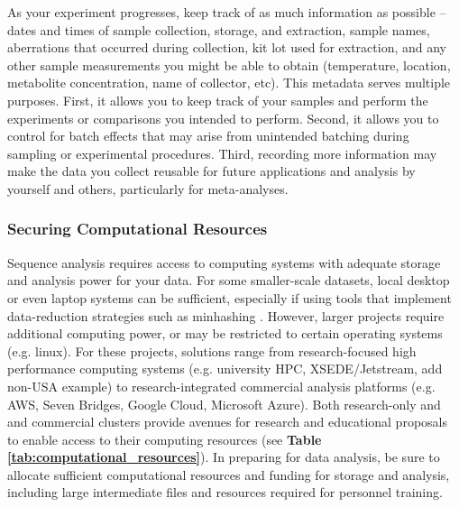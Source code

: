 \documentclass[10pt,letterpaper]{article}
\begin{document}
As your experiment progresses, keep track of as much information as possible -- dates and times of sample collection, storage, and extraction, sample names, aberrations that occurred during collection, kit lot used for extraction, and any other sample measurements you might be able to obtain (temperature, location, metabolite concentration, name of collector, etc). 
This metadata serves multiple purposes. 
First, it allows you to keep track of your samples and perform the experiments or comparisons you intended to perform. 
Second, it allows you to control for batch effects that may arise from unintended batching during sampling or experimental procedures. 
Third, recording more information may make the data you collect reusable for future applications and analysis by yourself and others, particularly for meta-analyses. 

\subsubsection*{Securing Computational Resources}

Sequence analysis requires access to computing systems with adequate storage and analysis power for your data. 
For some smaller-scale datasets, local desktop or even laptop systems can be sufficient, especially if using tools that implement data-reduction strategies such as minhashing \cite{rowe2019streaming}. 
However, larger projects require additional computing power, or may be restricted to certain operating systems (e.g. linux). 
For these projects, solutions range from research-focused high performance computing systems (e.g. university HPC, XSEDE/Jetstream, add non-USA example) to research-integrated commercial analysis platforms (e.g. AWS, Seven Bridges, Google Cloud, Microsoft Azure). 
Both research-only and  and commercial clusters provide avenues for research and educational proposals to enable access to their computing resources (see \textbf{Table \ref{tab:computational_resources}}). 
In preparing for data analysis, be sure to allocate sufficient computational resources and funding for storage and analysis, including large intermediate files and resources required for personnel training. 
\end{document}
